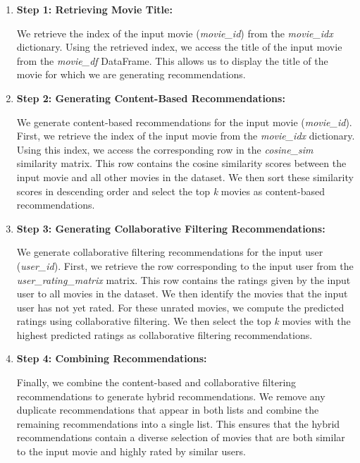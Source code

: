 \documentclass[a4paper]{article}
\theoremstyle{plain}
\theoremstyle{definition}
\begin{document}
        \begin{enumerate}
            \item \textbf{Step 1: Retrieving Movie Title:}
            
            We retrieve the index of the input movie (\textit{movie\_id}) from the \textit{movie\_idx} dictionary. Using the retrieved index, we access the title of the input movie from the \textit{movie\_df} DataFrame. This allows us to display the title of the movie for which we are generating recommendations.
            
            \item \textbf{Step 2: Generating Content-Based Recommendations:}
            
            We generate content-based recommendations for the input movie (\textit{movie\_id}). First, we retrieve the index of the input movie from the \textit{movie\_idx} dictionary. Using this index, we access the corresponding row in the \textit{cosine\_sim} similarity matrix. This row contains the cosine similarity scores between the input movie and all other movies in the dataset. We then sort these similarity scores in descending order and select the top \textit{k} movies as content-based recommendations.
            
            \item \textbf{Step 3: Generating Collaborative Filtering Recommendations:}
            
            We generate collaborative filtering recommendations for the input user (\textit{user\_id}). First, we retrieve the row corresponding to the input user from the \textit{user\_rating\_matrix} matrix. This row contains the ratings given by the input user to all movies in the dataset. We then identify the movies that the input user has not yet rated. For these unrated movies, we compute the predicted ratings using collaborative filtering. We then select the top \textit{k} movies with the highest predicted ratings as collaborative filtering recommendations.
            
            \item \textbf{Step 4: Combining Recommendations:}
            
            Finally, we combine the content-based and collaborative filtering recommendations to generate hybrid recommendations. We remove any duplicate recommendations that appear in both lists and combine the remaining recommendations into a single list. This ensures that the hybrid recommendations contain a diverse selection of movies that are both similar to the input movie and highly rated by similar users.
            

\end{enumerate}
\end{document}
